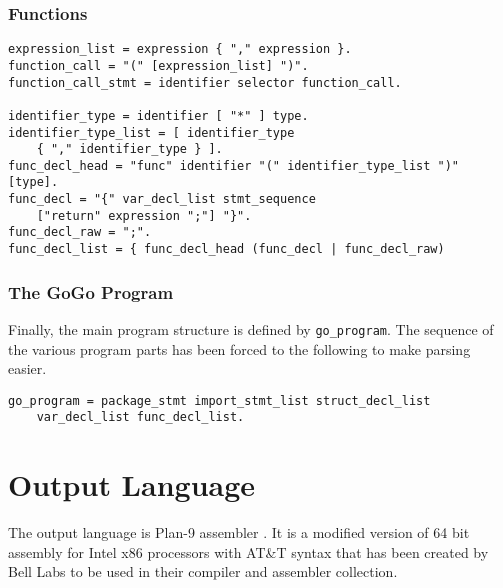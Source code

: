 \documentclass[a4paper]{scrreprt}
\begin{document}
      \subsection*{Functions}

        \begin{lstlisting}[caption=Functions]
expression_list = expression { "," expression }.
function_call = "(" [expression_list] ")".
function_call_stmt = identifier selector function_call.

identifier_type = identifier [ "*" ] type.
identifier_type_list = [ identifier_type 
    { "," identifier_type } ].
func_decl_head = "func" identifier "(" identifier_type_list ")"  [type].
func_decl = "{" var_decl_list stmt_sequence 
    ["return" expression ";"] "}".
func_decl_raw = ";".
func_decl_list = { func_decl_head (func_decl | func_decl_raw) 
        \end{lstlisting}

      \subsection*{The GoGo Program}
        Finally, the main program structure is defined by \texttt{go\_program}. The sequence of the various program parts has been forced to the following to make parsing easier.

        \begin{lstlisting}[caption=GoGo Program]
go_program = package_stmt import_stmt_list struct_decl_list 
    var_decl_list func_decl_list.
        \end{lstlisting}


  \chapter{Output Language}
    The output language is Plan-9 assembler \cite{pik00}. It is a modified version of 64 bit assembly for Intel x86 processors with AT\&T syntax that has been created by Bell Labs to be used in their compiler and assembler collection.
    
\end{document}
